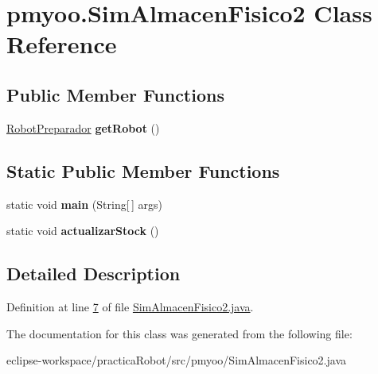 \hypertarget{classpmyoo_1_1_sim_almacen_fisico2}{}\section{pmyoo.\+Sim\+Almacen\+Fisico2 Class Reference}
\label{classpmyoo_1_1_sim_almacen_fisico2}
\subsection*{Public Member Functions}
\begin{DoxyCompactItemize}
\item 
\mbox{\label{classpmyoo_1_1_sim_almacen_fisico2_a320616b7a7212efea938c89ba99318ed}} 
\mbox{\hyperlink{classpmyoo_1_1_robot_preparador}{Robot\+Preparador}} {\bfseries get\+Robot} ()
\end{DoxyCompactItemize}
\subsection*{Static Public Member Functions}
\begin{DoxyCompactItemize}
\item 
\mbox{\label{classpmyoo_1_1_sim_almacen_fisico2_ac09ed68f6ad0bb7380027bac83e2aa8f}} 
static void {\bfseries main} (String\mbox{[}$\,$\mbox{]} args)
\item 
\mbox{\label{classpmyoo_1_1_sim_almacen_fisico2_a4a5a3b6c2da5d4c6285e3adf5aad5bb3}} 
static void {\bfseries actualizar\+Stock} ()
\end{DoxyCompactItemize}


\subsection{Detailed Description}


Definition at line \mbox{\hyperlink{_sim_almacen_fisico2_8java_source_l00007}{7}} of file \mbox{\hyperlink{_sim_almacen_fisico2_8java_source}{Sim\+Almacen\+Fisico2.\+java}}.



The documentation for this class was generated from the following file\+:\begin{DoxyCompactItemize}
\item 
eclipse-\/workspace/practica\+Robot/src/pmyoo/Sim\+Almacen\+Fisico2.\+java\end{DoxyCompactItemize}
